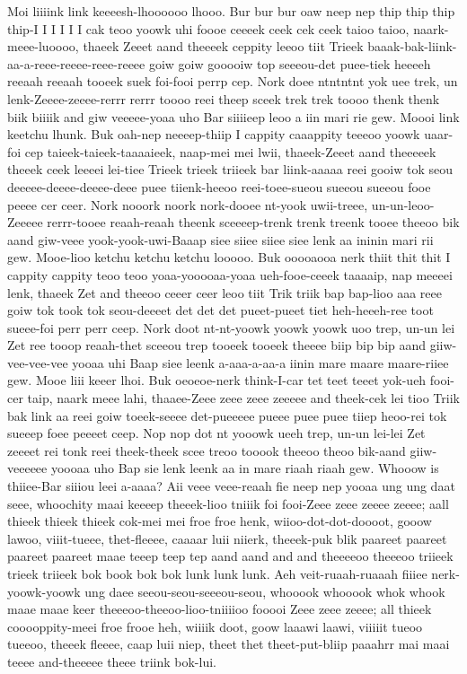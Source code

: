 \documentclass[12pt,a4paper]{article}
\begin{document}
\begin{drama}
Moi liiiink link keeeesh-lhoooooo lhooo. Bur bur bur oaw neep nep thip thip thip thip-I I I I I I cak teoo yoowk uhi foooe ceeeek ceek cek ceek taioo taioo, naark-meee-luoooo, thaeek Zeeet aand theeeek ceppity leeoo tiit Trieek baaak-bak-liink-aa-a-reee-reeee-reee-reeee goiw goiw gooooiw top seeeou-det puee-tiek heeeeh reeaah reeaah tooeek suek foi-fooi perrp cep. Nork doee ntntntnt yok uee trek, un lenk-Zeeee-zeeee-rerrr rerrr toooo reei theep sceek trek trek toooo thenk thenk biik biiiik and giw veeeee-yoaa uho Bar siiiieep leoo a iin mari rie gew. Moooi link keetchu lhunk. Buk oah-nep neeeep-thiip I cappity caaappity teeeoo yoowk uaar-foi cep taieek-taieek-taaaaieek, naap-mei mei lwii, thaeek-Zeeet aand theeeeek theeek ceek leeeei lei-tiee Trieek trieek triieek bar liink-aaaaa reei gooiw tok seou deeeee-deeee-deeee-deee puee tiienk-heeoo reei-toee-sueou sueeou sueeou fooe peeee cer ceer. Nork nooork noork nork-dooee nt-yook uwii-treee, un-un-leoo-Zeeeee rerrr-tooee reaah-reaah theenk sceeeep-trenk trenk treenk tooee theeoo bik aand giw-veee yook-yook-uwi-Baaap siee siiee siiee siee lenk aa ininin mari rii gew. Mooe-lioo ketchu ketchu ketchu looooo. Buk ooooaooa nerk thiit thit thit I cappity cappity teoo teoo yoaa-yooooaa-yoaa ueh-fooe-ceeek taaaaip, nap meeeei lenk, thaeek Zet and theeoo ceeer ceer leoo tiit Trik triik bap bap-lioo aaa reee goiw tok took tok seou-deeeet det det det pueet-pueet tiet heh-heeeh-ree toot sueee-foi perr perr ceep. Nork doot nt-nt-yoowk yoowk yoowk uoo trep, un-un lei Zet ree tooop reaah-thet sceeou trep tooeek tooeek theeee biip bip bip aand giiw-vee-vee-vee yooaa uhi Baap siee leenk a-aaa-a-aa-a iinin mare maare maare-riiee gew. Mooe liii keeer lhoi. Buk oeoeoe-nerk think-I-car tet teet teeet yok-ueh fooi-cer taip, naark meee lahi, thaaee-Zeee zeee zeee zeeeee and theek-cek lei tioo Triik bak link aa reei goiw toeek-seeee det-pueeeee pueee puee puee tiiep heoo-rei tok sueeep foee peeeet ceep. Nop nop dot nt yooowk ueeh trep, un-un lei-lei Zet zeeeet rei tonk reei theek-theek scee treoo tooook theeoo theoo bik-aand giiw-veeeeee yoooaa uho Bap sie lenk leenk aa in mare riaah riaah gew.
\pistspeaks
Whooow is thiiee-Bar siiiou leei a-aaaa?
\promspeaks
Aii veee veee-reaah fie neep nep yooaa ung ung daat seee, whoochity maai keeeep theeek-lioo tniiik foi fooi-Zeee zeee zeeee zeeee; aall thieek thieek thieek cok-mei mei froe froe henk, wiioo-dot-dot-doooot, gooow lawoo, viiit-tueee, thet-fleeee, caaaar luii niierk, theeek-puk blik paareet paareet paareet paareet maae teeep teep tep aand aand and and theeeeoo theeeoo triieek trieek triieek bok book bok bok lunk lunk lunk. Aeh veit-ruaah-ruaaah fiiiee nerk-yoowk-yoowk ung daee seeou-seou-seeeou-seou, whooook whooook whok whook maae maae keer theeeoo-theeoo-lioo-tniiiioo fooooi Zeee zeee zeeee; all thieek cooooppity-meei froe frooe heh, wiiiik doot, goow laaawi laawi, viiiiit tueoo tueeoo, theeek fleeee, caap luii niep, theet thet theet-put-bliip paaahrr mai maai teeee and-theeeee theee triink bok-lui.

\end{drama}
\end{document}
